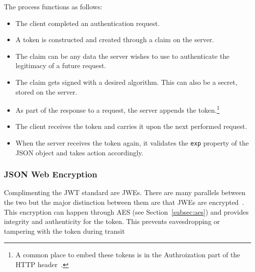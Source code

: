 The process functions as follows:
\begin{itemize}
  \item The client completed an authentication request.
  \item A token is constructed and created through a claim on the server.
  \item The claim can be any data the server wishes to use to authenticate the
  legitimacy of a future request.
  \item The claim gets signed with a desired algorithm.
  This can also be a secret, stored on the server.
  \item As part of the response to a request, the server appends the token.\footnote{
    A common place to embed these tokens is in the Authroization part of the
    HTTP header~\cite{RFC7519}.
  }
  \item The client receives the token and carries it upon the next performed
  request.
  \item When the server receives the token again, it validates the \texttt{exp}
  property of the JSON object and takes action accordingly.
\end{itemize}

\subsubsection{JSON Web Encryption}
Complimenting the JWT standard are JWEs.
There are many parallels between the two but the major distinction between them
are that JWEs are encrypted~\cite{rfc7516}.
This encryption can happen through AES (see Section~\ref{subsec:aes}) and
provides integrity and authenticity for the token.
This prevents eavesdropping or tampering with the token during transit
